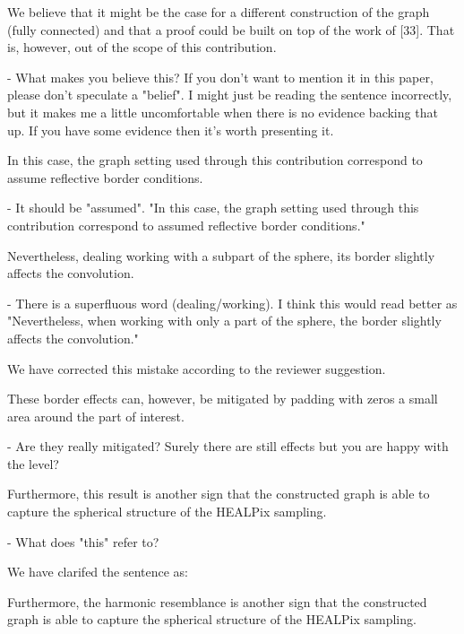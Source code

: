 \documentclass[12pt,a4paper]{article}
\newcommand{\todo}[1]{{\color[rgb]{.6,.1,.6}{TODO: #1}}}
\newcommand{\1}{\b{1}}              %
\newcommand{\0}{\b{0}}              %
\begin{document}
\begin{mdframed}[style=comment] 
We believe that it might be the case for a different construction of the graph (fully connected) and that a proof could be built on top of the work of [33]. That is, however, out of the scope of this contribution. 

- What makes you believe this? If you don't want to mention it in this paper, please don't speculate a "belief". I might just be reading the sentence incorrectly, but it makes me a little uncomfortable when there is no evidence backing that up. If you have some evidence then it's worth presenting it.
\end{mdframed}
\todo{Assign: @nati, @michael}


\begin{mdframed}[style=comment] 
In this case, the graph setting used through this contribution correspond to assume reflective border conditions.

- It should be "assumed". "In this case, the graph setting used through this contribution correspond to assumed reflective border conditions."
\end{mdframed}
\todo{@assign: Tomek}

\begin{mdframed}[style=comment] 
Nevertheless, dealing working with a subpart of the sphere, its border slightly affects the convolution.

- There is a superfluous word (dealing/working). I think this would read better as "Nevertheless, when working with only a part of the sphere, the border slightly affects the convolution."
\end{mdframed}
We have corrected this mistake according to the reviewer suggestion.

\begin{mdframed}[style=comment] 
These border effects can, however, be mitigated by padding with zeros a small area around the part of interest.

- Are they really mitigated? Surely there are still effects but you are happy with the level?
\end{mdframed}
\todo{Assign: @nati, @michael}


\begin{mdframed}[style=comment] 
Furthermore, this result is another sign that the constructed graph is able to capture the spherical structure of the HEALPix sampling.

- What does "this" refer to?
\end{mdframed}
We have clarifed the sentence as:
\begin{mdframed}[style=manuscript] 
Furthermore, the harmonic resemblance is another sign that the constructed graph is able to capture the spherical
structure of the HEALPix sampling. 
\end{mdframed}
\end{document}
